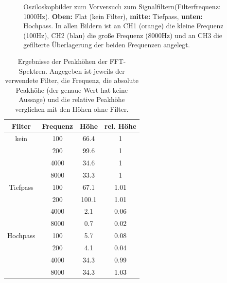 \documentclass[12pt,a4paper]{article}
\begin{document}
\begin{figure}
\caption{Osziloskopbilder zum Vorversuch zum Signalfiltern(Filterfrequenz: 1000Hz). \textbf{Oben:} Flat (kein Filter), \textbf{mitte:} Tiefpass, \textbf{unten:} Hochpass.
In allen Bildern ist an CH1 (orange) die kleine Frequenz (100Hz), CH2 (blau) die große Frequenz (8000Hz) und an CH3 die gefilterte Überlagerung der beiden Frequenzen angelegt.}
\label{fig:Vor3_Oszi2}
\end{figure}

\begin{table}
\centering
\begin{tabular}{|c|c|c|c|}
\hline
Filter & Frequenz & Höhe & rel. Höhe\\
\hline
kein & 100 & 66.4 & 1\\
\cline{2-4}
& 200 & 99.6 & 1\\
\cline{2-4}
& 4000 & 34.6 & 1\\
\cline{2-4}
& 8000 & 33.3 & 1\\
\hline
\hline
Tiefpass & 100 & 67.1 & 1.01\\
\cline{2-4}
& 200 & 100.1 & 1.01\\
\cline{2-4}
& 4000 & 2.1 & 0.06\\
\cline{2-4}
& 8000 & 0.7 & 0.02\\
\hline
\hline
Hochpass & 100 & 5.7 & 0.08\\
\cline{2-4}
& 200 & 4.1 & 0.04\\
\cline{2-4}
& 4000 & 34.3 & 0.99\\
\cline{2-4}
& 8000 & 34.3 & 1.03\\
\hline
\end{tabular} 
\caption{Ergebnisse der Peakhöhen der FFT-Spektren. Angegeben ist jeweils der verwendete Filter, die Frequenz, die absolute Peakhöhe (der genaue Wert hat keine Aussage) und die relative Peakhöhe verglichen mit den Höhen ohne Filter.}
\label{tab:Peakhohen}
\end{table}
\end{document}
